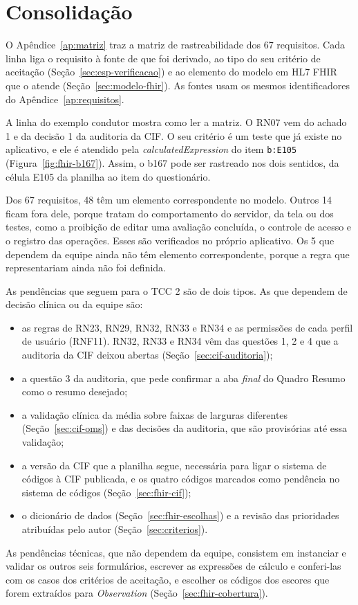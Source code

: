 \section{Consolidação}
\label{sec:consolidacao}

O Apêndice~\ref{ap:matriz} traz a matriz de rastreabilidade dos 67 requisitos. Cada linha liga o requisito à fonte de
que foi derivado, ao tipo do seu critério de aceitação (Seção~\ref{sec:esp-verificacao}) e ao elemento do modelo em
HL7 FHIR que o atende (Seção~\ref{sec:modelo-fhir}). As fontes usam os mesmos identificadores do
Apêndice~\ref{ap:requisitos}.

A linha do exemplo condutor mostra como ler a matriz. O RN07 vem do achado 1 e da decisão 1 da auditoria da CIF. O seu
critério é um teste que já existe no aplicativo, e ele é atendido pela \textit{calculatedExpression} do item
\texttt{b:E105} (Figura~\ref{fig:fhir-b167}). Assim, o b167 pode ser rastreado nos dois sentidos, da célula E105 da
planilha ao item do questionário.

Dos 67 requisitos, 48 têm um elemento correspondente no modelo. Outros 14 ficam fora dele, porque tratam do
comportamento do servidor, da tela ou dos testes, como a proibição de editar uma avaliação concluída, o controle de
acesso e o registro das operações. Esses são verificados no próprio aplicativo. Os 5 que dependem da equipe ainda
não têm elemento correspondente, porque a regra que representariam ainda não foi definida.

As pendências que seguem para o TCC 2 são de dois tipos. As que dependem de decisão clínica ou da equipe são:

\begin{itemize}
	\item as regras de RN23, RN29, RN32, RN33 e RN34 e as permissões de cada perfil de usuário (RNF11). RN32, RN33 e
	RN34 vêm das questões 1, 2 e 4 que a auditoria da CIF deixou abertas (Seção~\ref{sec:cif-auditoria});
	\item a questão 3 da auditoria, que pede confirmar a aba \textit{final} do Quadro Resumo como o resumo desejado;
	\item a validação clínica da média sobre faixas de larguras diferentes (Seção~\ref{sec:cif-oms}) e das decisões da
	auditoria, que são provisórias até essa validação;
	\item a versão da CIF que a planilha segue, necessária para ligar o sistema de códigos à CIF publicada, e os quatro
	códigos marcados como pendência no sistema de códigos (Seção~\ref{sec:fhir-cif});
	\item o dicionário de dados (Seção~\ref{sec:fhir-escolhas}) e a revisão das prioridades atribuídas pelo autor
	(Seção~\ref{sec:criterios}).
\end{itemize}

As pendências técnicas, que não dependem da equipe, consistem em instanciar e validar os outros seis formulários,
escrever as expressões de cálculo e conferi-las com os casos dos critérios de aceitação, e escolher os códigos dos
escores que forem extraídos para \textit{Observation} (Seção~\ref{sec:fhir-cobertura}).
